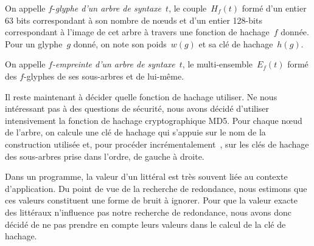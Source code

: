 \begin{defn}
On appelle $f$-\textit{glyphe d'un arbre de syntaxe}~$t$, le
couple~$H_f(t)$ formé d'un entier 63 bits correspondant à son nombre
de n{\oe}uds et d'un entier 128-bits correspondant à l'image de cet
arbre à travers une fonction de hachage~$f$ donnée. Pour un glyphe~$g$
donné, on note son poids~$w(g)$ et sa clé de hachage~$h(g)$.
\end{defn}


\begin{defn}
On appelle \textit{$f$-empreinte d'un arbre de syntaxe}~$t$, le
multi-ensemble~$E_f(t)$ formé des $f$-glyphes de ses sous-arbres
et de lui-même.
\end{defn}

Il reste maintenant à décider quelle fonction de hachage utiliser. Ne
nous intéressant pas à des questions de sécurité, nous avons décidé
d'utiliser intensivement la fonction de hachage cryptographique
MD5. Pour chaque n{\oe}ud de l'arbre, on calcule une clé de hachage
qui s'appuie sur le nom de la construction utilisée et, pour procéder
incrémentalement~\cite{DBLP:conf/ml/FilliatreC06}, sur les clés de
hachage des sous-arbres prise dans l'ordre, de gauche à droite.

Dans un programme, la valeur d'un littéral est très souvent liée au
contexte d'application. Du point de vue de la recherche de redondance, nous
estimons que ces valeurs constituent une forme de bruit à ignorer.
Pour que la valeur exacte des littéraux n'influence pas notre recherche
de redondance, nous avons donc décidé de ne pas prendre en compte leurs
valeurs dans le calcul de la clé de hachage.



